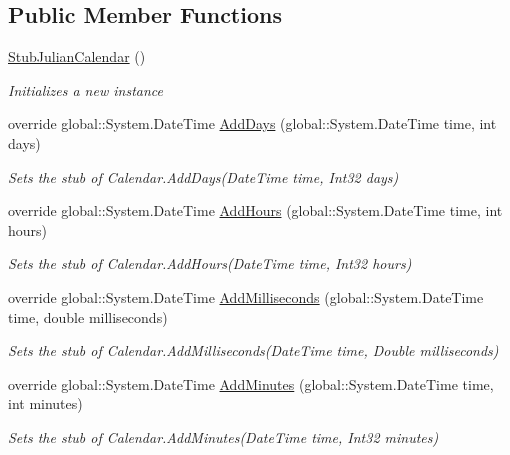\subsection*{Public Member Functions}
\begin{DoxyCompactItemize}
\item 
\hyperlink{class_system_1_1_globalization_1_1_fakes_1_1_stub_julian_calendar_a2fef93692ea68e51d84243924590a23a}{Stub\-Julian\-Calendar} ()
\begin{DoxyCompactList}\small\item\em Initializes a new instance\end{DoxyCompactList}\item 
override global\-::\-System.\-Date\-Time \hyperlink{class_system_1_1_globalization_1_1_fakes_1_1_stub_julian_calendar_a04bda77defa6d546ecd61c76498b8599}{Add\-Days} (global\-::\-System.\-Date\-Time time, int days)
\begin{DoxyCompactList}\small\item\em Sets the stub of Calendar.\-Add\-Days(\-Date\-Time time, Int32 days)\end{DoxyCompactList}\item 
override global\-::\-System.\-Date\-Time \hyperlink{class_system_1_1_globalization_1_1_fakes_1_1_stub_julian_calendar_a0d0f7cc0501ec2a5713ea09de649aef6}{Add\-Hours} (global\-::\-System.\-Date\-Time time, int hours)
\begin{DoxyCompactList}\small\item\em Sets the stub of Calendar.\-Add\-Hours(\-Date\-Time time, Int32 hours)\end{DoxyCompactList}\item 
override global\-::\-System.\-Date\-Time \hyperlink{class_system_1_1_globalization_1_1_fakes_1_1_stub_julian_calendar_a7ce500104e8cfa69ff775061891da80b}{Add\-Milliseconds} (global\-::\-System.\-Date\-Time time, double milliseconds)
\begin{DoxyCompactList}\small\item\em Sets the stub of Calendar.\-Add\-Milliseconds(\-Date\-Time time, Double milliseconds)\end{DoxyCompactList}\item 
override global\-::\-System.\-Date\-Time \hyperlink{class_system_1_1_globalization_1_1_fakes_1_1_stub_julian_calendar_a7251fce9f23f97973cb44035f50b51f0}{Add\-Minutes} (global\-::\-System.\-Date\-Time time, int minutes)
\begin{DoxyCompactList}\small\item\em Sets the stub of Calendar.\-Add\-Minutes(\-Date\-Time time, Int32 minutes)\end{DoxyCompactList}\item 

\end{DoxyCompactItemize}
